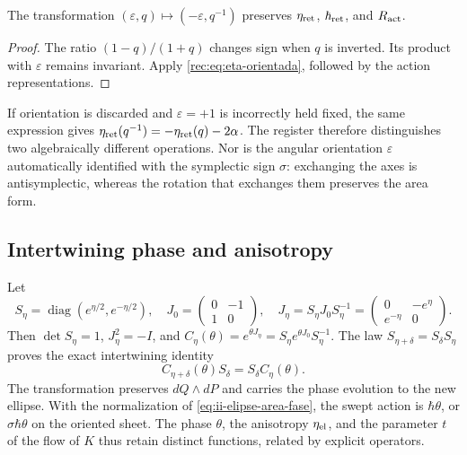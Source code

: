 \begin{corollary}
The transformation \((\varepsilon,q)\mapsto(-\varepsilon,q^{-1})\) preserves \(\eta_{\rm ret}\), \(\hbar_{\rm ret}\), and \(R_{\rm act}\).
\end{corollary}
\begin{proof}
The ratio \((1-q)/(1+q)\) changes sign when \(q\) is inverted. Its product with \(\varepsilon\) remains invariant. Apply \eqref{rec:eq:eta-orientada}, followed by the action representations.
\end{proof}

If orientation is discarded and \(\varepsilon=+1\) is incorrectly held fixed, the same expression gives \(\eta_{\rm ret}(q^{-1})=-\eta_{\rm ret}(q)-2\alpha\). The register therefore distinguishes two algebraically different operations. Nor is the angular orientation \(\varepsilon\) automatically identified with the symplectic sign \(\sigma\): exchanging the axes is antisymplectic, whereas the rotation that exchanges them preserves the area form.

\subsection{Intertwining phase and anisotropy}

Let
\[
 S_\eta=\operatorname{diag}(e^{\eta/2},e^{-\eta/2}),\quad
 J_0=\begin{pmatrix}0&-1\\1&0\end{pmatrix},\quad
 J_\eta=S_\eta J_0S_\eta^{-1}
       =\begin{pmatrix}0&-e^\eta\\e^{-\eta}&0\end{pmatrix}.
\]
Then \(\det S_\eta=1\), \(J_\eta^2=-I\), and
\(C_\eta(\theta)=e^{\theta J_\eta}=S_\eta e^{\theta J_0}S_\eta^{-1}\).
The law \(S_{\eta+\delta}=S_\delta S_\eta\) proves the exact intertwining identity
\begin{equation}
 C_{\eta+\delta}(\theta)S_\delta=S_\delta C_\eta(\theta).
 \label{rec:eq:entrelazamiento}
\end{equation}
The transformation preserves \(dQ\wedge dP\) and carries the phase evolution to the new ellipse. With the normalization of \eqref{eq:ii-elipse-area-fase}, the swept action is \(\hbar\theta\), or \(\sigma\hbar\theta\) on the oriented sheet. The phase \(\theta\), the anisotropy \(\eta_{\rm el}\), and the parameter \(t\) of the flow of \(K\) thus retain distinct functions, related by explicit operators.
